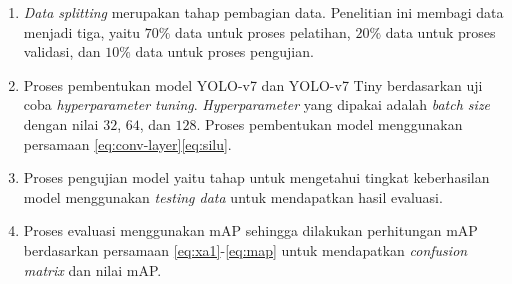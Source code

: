 \begin{enumerate}
    \item \textit{Data splitting} merupakan tahap pembagian data. Penelitian ini membagi data menjadi tiga, yaitu $70\%$ data untuk proses pelatihan, $20\%$ data untuk proses validasi, dan $10\%$ data untuk proses pengujian.
    \item Proses pembentukan model YOLO-v7 dan YOLO-v7 Tiny berdasarkan uji coba \textit{hyperparameter tuning}. \textit{Hyperparameter} yang dipakai adalah \textit{batch size} dengan nilai $32$, $64$, dan $128$. Proses pembentukan model menggunakan persamaan \ref{eq:conv-layer}\ref{eq:silu}.
    \item Proses pengujian model yaitu tahap untuk mengetahui tingkat keberhasilan model menggunakan \textit{testing data} untuk mendapatkan hasil evaluasi.
    \item Proses evaluasi menggunakan mAP sehingga dilakukan perhitungan mAP berdasarkan persamaan \ref{eq:xa1}-\ref{eq:map} untuk mendapatkan \textit{confusion matrix} dan nilai mAP.
\end{enumerate}
